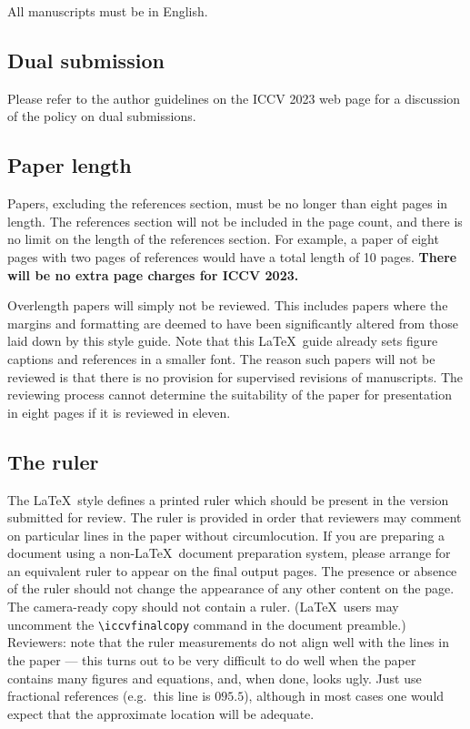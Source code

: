 \documentclass[10pt,twocolumn,letterpaper]{article}
\begin{document}
All manuscripts must be in English.

\subsection{Dual submission}

Please refer to the author guidelines on the ICCV 2023 web page for a
discussion of the policy on dual submissions.

\subsection{Paper length}
Papers, excluding the references section,
must be no longer than eight pages in length. The references section
will not be included in the page count, and there is no limit on the
length of the references section. For example, a paper of eight pages
with two pages of references would have a total length of 10 pages.
{\bf There will be no extra page charges for ICCV 2023.}

Overlength papers will simply not be reviewed.  This includes papers
where the margins and formatting are deemed to have been significantly
altered from those laid down by this style guide.  Note that this
\LaTeX\ guide already sets figure captions and references in a smaller font.
The reason such papers will not be reviewed is that there is no provision for
supervised revisions of manuscripts.  The reviewing process cannot determine
the suitability of the paper for presentation in eight pages if it is
reviewed in eleven.  

\subsection{The ruler}
The \LaTeX\ style defines a printed ruler which should be present in the
version submitted for review.  The ruler is provided in order that
reviewers may comment on particular lines in the paper without
circumlocution.  If you are preparing a document using a non-\LaTeX\
document preparation system, please arrange for an equivalent ruler to
appear on the final output pages.  The presence or absence of the ruler
should not change the appearance of any other content on the page.  The
camera-ready copy should not contain a ruler. (\LaTeX\ users may uncomment
the \verb'\iccvfinalcopy' command in the document preamble.)  Reviewers:
note that the ruler measurements do not align well with the lines in the paper
--- this turns out to be very difficult to do well when the paper contains
many figures and equations, and, when done, looks ugly.  Just use fractional
references (e.g.\ this line is $095.5$), although in most cases one would
expect that the approximate location will be adequate.
\end{document}
